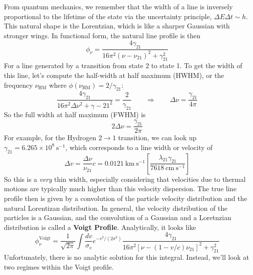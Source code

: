 \documentclass[10pt]{article}
\numberwithin{equation}{section}
\newcommand{\n}{\noindent}
\begin{document}
\n From quantum mechanics, we remember that the width of a line is inversely
proportional to the lifetime of the state via the uncertainty principle,
$\Delta E \Delta t \sim h$. This natural shape is the Lorentzian, which is like
a sharper Gaussian with stronger wings. In functional form, the natural line
profile is then
\begin{equation}
  \label{eq:ew:3} \phi_\nu = \frac{4\gamma_{21}}{16\pi^2(\nu - \nu_{21})^2 +
  \gamma_{21}^2}
\end{equation}
For a line generated by a transition from state 2 to state 1. To get the width
of this line, let's compute the half-width at half maximum (HWHM), or the
frequency $\nu_{\mathrm{HM}}$ where $\phi(\nu_{\mathrm{HM}}) = 2/\gamma_{21}$:
\begin{equation}
  \label{eq:ew:4} \frac{4\gamma_{21}}{16\pi^2\Delta\nu^2+\gamma-{21}^2} =
  \frac{2}{\gamma_{21}} \qquad \Rightarrow \qquad \Delta \nu =
  \frac{\gamma_{21}}{4\pi}
\end{equation}
So the full width at half maximum (FWHM) is
\begin{equation}
  \label{eq:ew:5} \boxed{2\Delta \nu = \frac{\gamma_{21}}{2\pi}}
\end{equation}
For example, for the Hydrogen $2\to 1$ transition, we can look up $\gamma_{21}
= 6.265\times 10^8\ \mathrm{s^{-1}}$, which corresponds to a line width or
velocity of
\begin{equation}
  \label{eq:ew:6} \Delta v = \frac{\Delta\nu}{\nu_{21}}c = 0.0121\ \mathrm{km\
  s^{-1}} \left[\frac{\lambda_{21}\gamma_{21}}{7618\ \mathrm{cm\ s^{-1}}}\right]
\end{equation}
So this is a \emph{very} thin width, especially considering that velocities due
to thermal motions are typically much higher than this velocity dispersion. The
true line profile then is given by a convolution of the particle velocity
distribution and the natural Lorentizan distribution. In general, the velocity
distribution of the particles is a Gaussian, and the convolution of a Gaussian
and a Loretnzian distribution is called a \textbf{Voigt Profile}. Analytically,
it looks like
\begin{equation}
  \label{eq:ew:7} \boxed{\phi_\nu^{\mathrm{Voigt}} = \frac{1}{\sqrt{2\pi}}\int
  \frac{dv}{\sigma_{v}}e^{-v^2/(2\sigma^2)}\frac{4\gamma_{21}}{16\pi^2\left[\nu-
  (1-v/c)\nu_{21}\right]^2 + \gamma_{21}^2}}
\end{equation}
Unfortunately, there is no analytic solution for this integral. Instead, we'll
look at two regimes within the Voigt profile.
\end{document}
